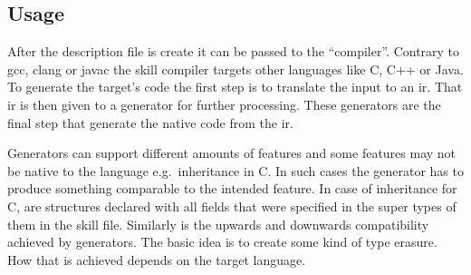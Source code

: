 \documentclass[thesis]{subfiles}
\begin{document}
  \subsection{ Usage}
    After the description file is create it can be passed to the ``compiler''.
    Contrary to gcc, clang or javac the \gls{skill} compiler targets other languages like C, C++ or Java.
    To generate the target's code the first step is to translate the input to an \gls{ir}.
    That \gls{ir} is then given to a generator for further processing.
    These generators are the final step that generate the native code from the \gls{ir}.

    Generators can support different amounts of features and some features may not be native to the language e.g.\ inheritance in C.
    In such cases the generator has to produce something comparable to the intended feature.
    In case of inheritance for C, are structures declared with all fields that were specified in the super types of them in the \gls{skill} file.
    Similarly is the upwards and downwards compatibility achieved by generators.
    The basic idea is to create some kind of type erasure.
    How that is achieved depends on the target language.
\end{document}
